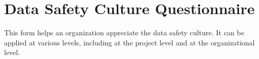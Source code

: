 %
%
\chapter{Data Safety Culture Questionnaire} \label{bkm:culture}


This form helps an organization appreciate the data safety culture. It can be applied at various levels, including at the project level and at the organizational level.

